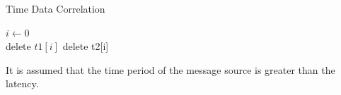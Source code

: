 \begin{algorithm}[!h]
\caption{Time Data Correlation}
\begin{algorithmic}
\State $i \gets 0$
 \\
\hspace{1.35cm} delete $t1[i]$
delete t2[i]
\EndIf
\EndFor
\end{algorithmic}
\end{algorithm}
It is assumed that the time period of the message source is greater than the latency.\\

